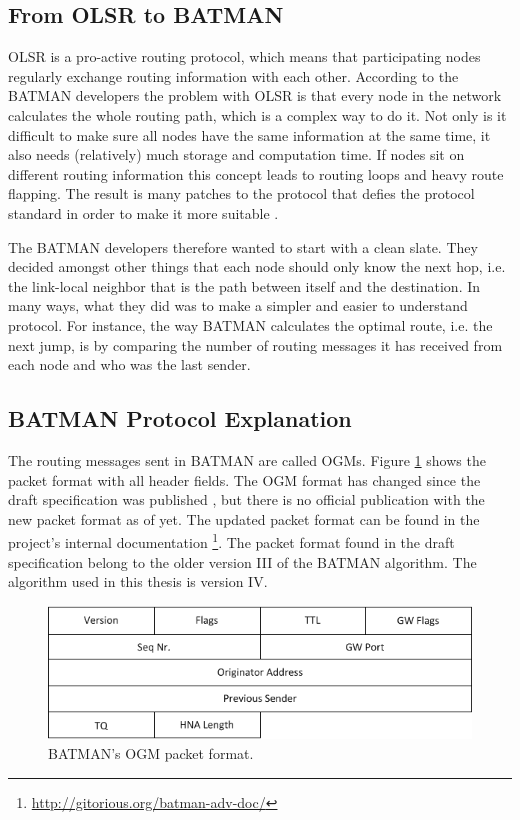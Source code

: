 \subsection{From OLSR to BATMAN}
OLSR is a pro-active routing protocol, which means that participating nodes
regularly exchange routing information with each other. According to the BATMAN
developers the problem with OLSR is that every node in the network calculates
the whole routing path, which is a complex way to do it. Not only is it
difficult to make sure all nodes have the same information at the same time,
it also needs (relatively) much storage and computation time. If nodes sit on
different routing information this concept leads to routing loops and heavy
route flapping. The result is many patches to the protocol that defies the
protocol standard in order to make it more suitable \cite{why-starting-batman}.

The BATMAN developers therefore wanted to start with a clean slate. They decided
amongst other things that each node should only know the next hop, i.e. the
link-local neighbor that is the path between itself and the destination. In
many ways, what they did was to make a simpler and easier to understand
protocol. For instance, the way BATMAN calculates the optimal route, i.e. the
next jump, is by comparing the number of routing messages it has received from
each node and who was the last sender.

\subsection{BATMAN Protocol Explanation}
The routing messages sent in BATMAN are called \acp{OGM}. Figure
\ref{fig:original_ogm} shows the packet format with all header fields. The
\ac{OGM} format has changed since the draft specification was published
\cite{batman_rfc}, but there is no official publication with the new packet
format as of yet. The updated packet format can be found in the project's
internal documentation \footnote{\url{http://gitorious.org/batman-adv-doc/}}.
The packet format found in the draft specification belong to the older version
III of the BATMAN algorithm. The algorithm used in this thesis is version IV.

\begin{figure}[h]
	\centering
  	\includegraphics[width=\textwidth]{images/original_ogm.png}
  	\caption{BATMAN's \acf{OGM} packet format.}
	\label{fig:original_ogm}
\end{figure}


